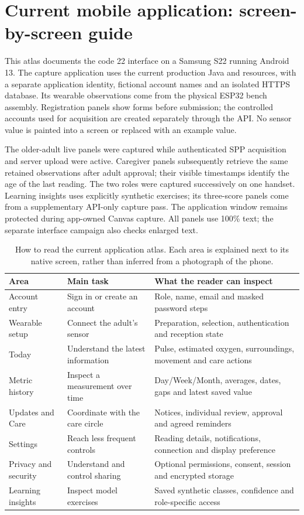 \clearpage
\section{Current mobile application: screen-by-screen guide}
\label{app:mobile-screens}

This atlas documents the code 22 interface on a Samsung S22 running Android 13. The capture application uses the current production Java and resources, with a separate application identity, fictional account names and an isolated HTTPS database. Its wearable observations come from the physical ESP32 bench assembly. Registration panels show forms before submission; the controlled accounts used for acquisition are created separately through the API. No sensor value is painted into a screen or replaced with an example value.

The older-adult live panels were captured while authenticated SPP acquisition and server upload were active. Caregiver panels subsequently retrieve the same retained observations after adult approval; their visible timestamps identify the age of the last reading. The two roles were captured successively on one handset. Learning insights uses explicitly synthetic exercises; its three-score panels come from a supplementary API-only capture pass. The application window remains protected during app-owned Canvas capture. All panels use 100\% text; the separate interface campaign also checks enlarged text.\cite{currentrevision,appatlas}

\begin{table}[H]\small
\caption{How to read the current application atlas. Each area is explained next to its native screen, rather than inferred from a photograph of the phone.}
\begin{tabularx}{\textwidth}{@{}P{30mm}P{41mm}Y@{}}\toprule
Area & Main task & What the reader can inspect\\\midrule
Account entry & Sign in or create an account & Role, name, email and masked password steps\\
Wearable setup & Connect the adult's sensor & Preparation, selection, authentication and reception state\\
Today & Understand the latest information & Pulse, estimated oxygen, surroundings, movement and care actions\\
Metric history & Inspect a measurement over time & Day/Week/Month, averages, dates, gaps and latest saved value\\
Updates and Care & Coordinate with the care circle & Notices, individual review, approval and agreed reminders\\
Settings & Reach less frequent controls & Reading details, notifications, connection and display preference\\
Privacy and security & Understand and control sharing & Optional permissions, consent, session and encrypted storage\\
Learning insights & Inspect model exercises & Saved synthetic classes, confidence and role-specific access\\\bottomrule
\end{tabularx}
\end{table}

